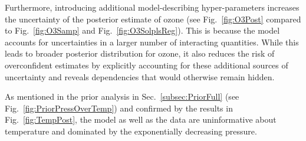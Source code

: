 \begin{mccorrection}
	Furthermore, introducing additional model-describing hyper-parameters increases the uncertainty of the posterior estimate of ozone (see Fig.~\ref{fig:O3Post} compared to Fig.~\ref{fig:O3Samp} and Fig.~\ref{fig:O3SolplsReg}). This is because the model accounts for uncertainties in a larger number of interacting quantities. While this leads to broader posterior distribution for ozone, it also reduces the risk of overconfident estimates by explicitly accounting for these additional sources of uncertainty and reveals dependencies that would otherwise remain hidden.
\end{mccorrection}


As mentioned in the prior analysis in Sec.~\ref{subsec:PriorFull} (see Fig.~\ref{fig:PriorPressOverTemp}) and confirmed by the results in Fig.~\ref{fig:TempPost}, the model as well as the data are uninformative about temperature and dominated by the exponentially decreasing pressure.




